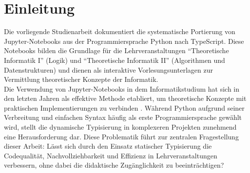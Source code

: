 \section{Einleitung}
Die vorliegende Studienarbeit dokumentiert die systematische Portierung von Jupyter-Notebooks aus der Programmiersprache Python nach TypeScript. Diese Notebooks bilden die Grundlage für die Lehrveranstaltungen \enquote{Theoretische Informatik I} (Logik) und \enquote{Theoretische Informatik II} (Algorithmen und Datenstrukturen) und dienen als interaktive Vorlesungsunterlagen zur Vermittlung theoretischer Konzepte der Informatik.\\
Die Verwendung von Jupyter-Notebooks in dem Informatikstudium hat sich in den letzten Jahren als effektive Methode etabliert, um theoretische Konzepte mit praktischen Implementierungen zu verbinden \cite{github-jupyter}. Während Python aufgrund seiner Verbreitung und einfachen Syntax häufig als erste Programmiersprache gewählt wird, stellt die dynamische Typisierung in komplexeren Projekten zunehmend eine Herausforderung dar. Diese Problematik führt zur zentralen Fragestellung dieser Arbeit: Lässt sich durch den Einsatz statischer Typisierung die Codequalität, Nachvollziehbarkeit und Effizienz in Lehrveranstaltungen verbessern, ohne dabei die didaktische Zugänglichkeit zu beeinträchtigen?


